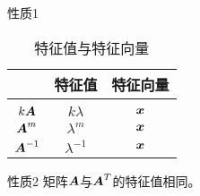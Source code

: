         \begin{frame}
          
          \begin{xingzhi}{性质1}
            \begin{table}
              \caption{特征值与特征向量}
              
              \begin{tabular}{|c|c|c|}\hline
                &特征值&特征向量\\\hline
                \red{$\MA$}&\red{$\lambda$}&\red{$\vx$}\\ \hline 
                \hline 
                $k\boldsymbol{A}$&$k\lambda$&$\vx$\\\hline
                $\boldsymbol{A}^m$&$\lambda^m$&$\vx$\\\hline
                $\boldsymbol{A}^{-1}$&$\lambda^{-1}$&$\vx$\\\hline
              \end{tabular}
            \end{table}
          \end{xingzhi}
          \begin{xingzhi}{性质2}
            矩阵$\MA$与$\boldsymbol{A}^T$的特征值相同。
          \end{xingzhi}
          
          
        \end{frame}

        

